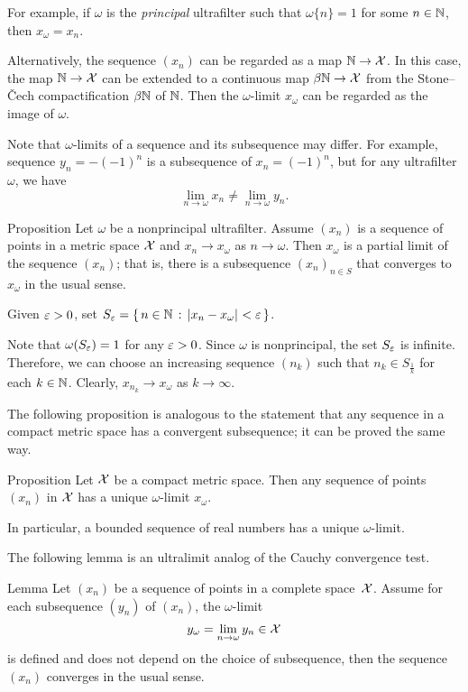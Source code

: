 For example, if $\omega$ is the {}\emph{principal} ultrafilter such that $\omega\{n\}=1$ for some $n\in\mathbb{N}$, then
$x_\omega=x_n$.

Alternatively, the sequence $(x_n)$ can be regarded as a map $\mathbb{N}\to\mathcal{X}$.
In this case, the map $\mathbb{N}\to\mathcal{X}$ can be extended to a continuous map $\beta\mathbb{N}\to\mathcal{X}$ from the Stone--\v{C}ech compactification $\beta\mathbb{N}$ of $\mathbb{N}$.
Then the $\omega$-limit $x_\omega$ can be regarded as the image of $\omega$.

Note that $\omega$-limits of a sequence and its subsequence may differ.
For example, sequence $y_n=-(-1)^n$ is a subsequence of $x_n=(-1)^n$, but for any ultrafilter $\omega$, we have
\[\lim_{n\to\omega}x_n
\ne
\lim_{n\to\omega}y_n.\] 

\begin{thm}{Proposition}\label{prop:ultra/partial}
Let $\omega$ be a nonprincipal ultrafilter.
Assume $(x_n)$ is a sequence of points in a metric space $\mathcal{X}$
and $x_n\to  x_\omega$ as $n\to\omega$.
Then $x_\omega$ is a partial limit of the sequence $(x_n)$;
that is, there is a subsequence $(x_n)_{n\in S}$ that converges to $x_\omega$ in the usual sense.
\end{thm}

Given $\varepsilon>0$, 
set $S_\eps=\set{n\in\NN}{\dist{x_n}{x_\omega}{}<\eps}$.

Note that $\omega(S_\varepsilon)=1$ for any $\varepsilon>0$.
Since $\omega$ is nonprincipal, the set $S_\varepsilon$ is infinite.
Therefore, we can choose an increasing sequence $(n_k)$
such that $n_k\in S_{\frac1k}$ for each $k\in \mathbb{N}$.
Clearly, $x_{n_k}\to x_\omega$ as $k\to\infty$.
\qeds

The following proposition 
is analogous to the statement that any sequence in a compact metric space 
has a convergent subsequence;
it can be proved the same way.

\begin{thm}{Proposition}\label{prop:ultra/compact}
Let $\mathcal{X}$ be a compact metric space.
Then
any sequence of points $(x_n)$ in $\mathcal{X}$ has a unique $\omega$-limit $x_\omega$.

In particular, a bounded sequence of real numbers has a unique $\omega$-limit.
\end{thm}

The following lemma is an ultralimit analog of the Cauchy convergence test.

\begin{thm}{Lemma}\label{lem:X-X^w}
Let $(x_n)$ be a sequence of points in a complete space~$\mathcal{X}$. 
Assume for each subsequence $(y_n)$ of $(x_n)$, 
the $\omega$-limit 
\[y_\omega=\lim_{n\to\omega}y_{n}\in \mathcal{X}\]
is defined and does not depend on the choice of subsequence, then the sequence $(x_n)$ converges in the usual sense.
\end{thm}

